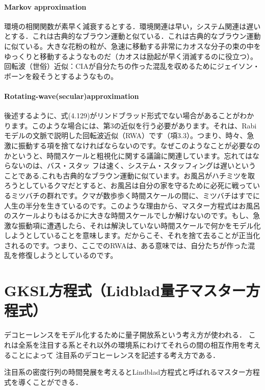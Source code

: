 \paragraph{Markov approximation}環境の相関関数が素早く減衰するとする．環境関連は早い，システム関連は遅いとする．これは古典的なブラウン運動と似ている．これは古典的なブラウン運動に似ている。大きな花粉の粒が、急速に移動する非常にカオスな分子の束の中をゆっくりと移動するようなものだ（カオスは励起が早く消滅するのに役立つ）。 回転波（世俗）近似：CIAが自分たちの作った混乱を収めるためにジェイソン・ボーンを殺そうとするようなもの。

\paragraph{Rotating-wave(secular)approximation}
後述するように、式(4.129)がリンドブラッド形式でない場合があることがわかります。このような場合には、第3の近似を行う必要があります。それは、Rabiモデルの文脈で説明した回転波近似（RWA）です（項3.3）。つまり、時々、急激に振動する項を捨てなければならないのです。なぜこのようなことが必要なのかというと、時間スケールと粗視化に関する議論に関連しています。忘れてはならないのは、バス・スタッ フは速く、システム・スタッフィングは遅いということである.これも古典的なブラウン運動に似ています。お風呂がハチミツを取ろうとしているクマだとすると、お風呂は自分の家を守るために必死に戦っているミツバチの群れです。クマが数歩歩く時間スケールの間に、ミツバチはすでに人生の半分を生きているのです。このような理由から、マスター方程式はお風呂のスケールよりもはるかに大きな時間スケールでしか解けないのです。もし、急激な振動項に遭遇したら、それは解決していない時間スケールで何かをモデル化しようとしていることを意味します。だからこそ、それを捨て去ることが正当化されるのです。つまり、ここでのRWAは、ある意味では、自分たちが作った混乱を修復しようとしているのです。


\section{GKSL方程式（Lidblad量子マスター方程式）}

デコヒーレンスをモデル化するために量子開放系という考え方が使われる．
これは全系を注目する系とそれ以外の環境系にわけてそれらの間の相互作用を考えることによって
注目系のデコヒーレンスを記述する考え方である．

注目系の密度行列の時間発展を考えるとLindblad方程式と呼ばれるマスター方程式を導くことができる．

